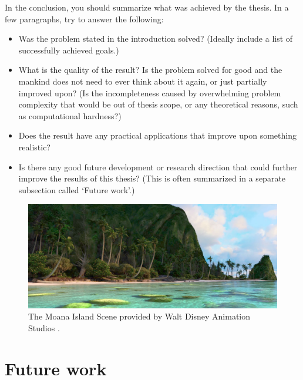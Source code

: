 \label{chap:conclusion}

In the conclusion, you should summarize what was achieved by the thesis. In a few paragraphs, try to answer the following:
\begin{itemize}
\item Was the problem stated in the introduction solved? (Ideally include a list of successfully achieved goals.)
\item What is the quality of the result? Is the problem solved for good and the mankind does not need to ever think about it again, or just partially improved upon? (Is the incompleteness caused by overwhelming problem complexity that would be out of thesis scope, or any theoretical reasons, such as computational hardness?)
\item Does the result have any practical applications that improve upon something realistic?
\item Is there any good future development or research direction that could further improve the results of this thesis? (This is often summarized in a separate subsection called `Future work'.)
\end{itemize}

\begin{figure} 
	\centering
	\includegraphics[width=1\linewidth]{img/concl/moana.png}
	\caption{The Moana Island Scene provided by Walt Disney Animation Studios \cite{moana2021}.}
	\label{fig:moana}
\end{figure}

\section{Future work}


